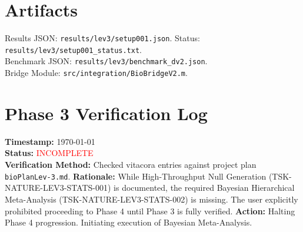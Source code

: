 \documentclass{article}
\begin{document}
\begin{table}[h]
\centering
\caption{Selected Results from High-Throughput Validation ($N=231$)}
\label{tab:hpc_results}
\end{table}

\section{Artifacts}
Results JSON: \texttt{results/lev3/setup001.json}. Status: \texttt{results/lev3/setup001\_status.txt}.\\
Benchmark JSON: \texttt{results/lev3/benchmark\_dv2.json}.\\
Bridge Module: \texttt{src/integration/BioBridgeV2.m}.

\section*{Phase 3 Verification Log}
\textbf{Timestamp:} \today \\
\textbf{Status:} \textcolor{red}{INCOMPLETE} \\
\textbf{Verification Method:} Checked vitacora entries against project plan \texttt{bioPlanLev-3.md}.
\textbf{Rationale:} While High-Throughput Null Generation (TSK-NATURE-LEV3-STATS-001) is documented, the required Bayesian Hierarchical Meta-Analysis (TSK-NATURE-LEV3-STATS-002) is missing. The user explicitly prohibited proceeding to Phase 4 until Phase 3 is fully verified.
\textbf{Action:} Halting Phase 4 progression. Initiating execution of Bayesian Meta-Analysis.
\end{document}

